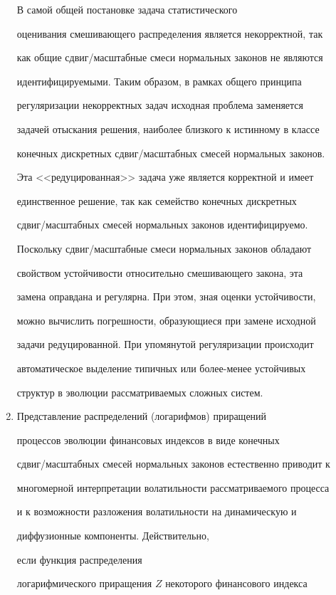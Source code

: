 \begin{multicols}{2}
\begin{enumerate}[($i$)]
В самой общей постановке задача статистического


оценивания смешивающего распределения является некорректной, так


как общие сдвиг/масштабные смеси нормальных законов не являются


идентифицируемыми. Таким образом, в рамках общего принципа


регуляризации некорректных задач исходная проблема заменяется


задачей отыскания решения, наиболее близкого к истинному в классе


конечных дискретных сдвиг/масштабных смесей нормальных законов.


Эта <<редуцированная>> задача уже является корректной и имеет


единственное решение, так как семейство конечных дискретных


сдвиг/масштабных смесей нормальных законов идентифицируемо.


Поскольку сдвиг/масштабные смеси нормальных законов обладают


свойством устойчивости относительно смешивающего закона, эта


замена оправдана и регулярна. При этом, зная оценки устойчивости,


можно вычислить погрешности, образующиеся при замене исходной


задачи редуцированной. При упомянутой регуляризации происходит


автоматическое выделение типичных или более-менее устойчивых


структур в эволюции рассматриваемых сложных систем.


\item


Представление распределений (логарифмов) приращений


процессов эволюции фи\-нан\-со\-вых индексов в виде конечных


сдвиг/масштабных смесей нормальных законов естественно приводит к


многомерной интерпретации волатильности рассматрива\-емого процесса


и к возможности разложения волатильности на динамическую и


диффузионные компоненты. Действительно,\linebreak 


если функция распределения


логарифмического приращения $Z$ некоторого финансового индекса



\end{enumerate}
\end{multicols}
